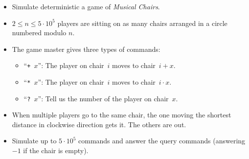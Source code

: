 \begin{frame}
    \frametitle{\problemtitle}

    \begin{columns}
        \begin{column}[T]{.60\textwidth}
            \begin{itemize}
                \item Simulate deterministic a game of \emph{Musical Chairs}.
                \item $2\leq n\leq 5\cdot 10^5$ players are sitting on as many
                  chairs arranged in a circle numbered modulo $n$.
                \item The game master gives three types of commands:
                  \begin{itemize}
                    \item ``\texttt{+~$x$}'': The player on chair~$i$ moves to chair~$i+x$.
                    \item ``\texttt{*~$x$}'': The player on chair~$i$ moves to chair~$i\cdot{}x$.
                    \item ``\texttt{?~$x$}'': Tell us the number of the player on chair~$x$.
                  \end{itemize}
                \item  When multiple players go to the same
                      chair, the one moving the shortest distance in clockwise
                      direction gets it. The others are out.
                \item Simulate up to $5\cdot 10^5$ commands and answer the query commands
                  (answering $-1$ if the chair is empty).
            \end{itemize}
        \end{column}

    \end{columns}
\end{frame}
